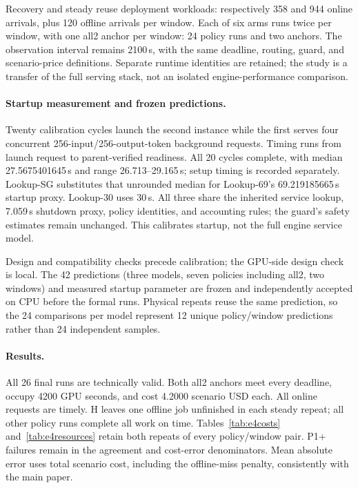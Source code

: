 Recovery and steady reuse deployment workloads: respectively 358 and 944
online arrivals, plus 120 offline arrivals per window. Each of six arms
runs twice per window, with one all2 anchor per window: 24 policy runs
and two anchors. The observation interval remains 2100\,s, with the same
deadline, routing, guard, and scenario-price definitions. Separate runtime
identities are retained; the study is a transfer of the full serving stack,
not an isolated engine-performance comparison.

\paragraph{Startup measurement and frozen predictions.}
Twenty calibration cycles launch the second instance while the first
serves four concurrent 256-input/256-output-token background requests.
Timing runs from launch request to parent-verified readiness. All 20 cycles
complete, with median 27.5675401645\,s and range 26.713--29.165\,s;
setup timing is recorded separately. Lookup-SG substitutes that unrounded
median for Lookup-69's 69.219185665\,s startup proxy. Lookup-30 uses 30\,s.
All three share the inherited service lookup, 7.059\,s shutdown proxy,
policy identities, and accounting rules; the guard's safety estimates
remain unchanged. This calibrates startup, not the full engine service model.

Design and compatibility checks precede calibration; the GPU-side design
check is local. The 42 predictions (three models, seven policies including
all2, two windows) and measured startup parameter are frozen and independently
accepted on CPU before the formal runs. Physical repeats reuse the same
prediction, so the 24 comparisons per model represent 12 unique policy/window
predictions rather than 24 independent samples.

\paragraph{Results.}
All 26 final runs are technically valid. Both all2 anchors meet every deadline,
occupy 4200 GPU seconds, and cost 4.2000 scenario USD each. All online
requests are timely. H leaves one offline job unfinished in each steady
repeat; all other policy runs complete all work on time.
Tables~\ref{tab:e4costs} and~\ref{tab:e4resources} retain both repeats of
every policy/window pair. P1+ failures remain in the agreement and cost-error
denominators. Mean absolute error uses total scenario cost, including the
offline-miss penalty, consistently with the main paper.

